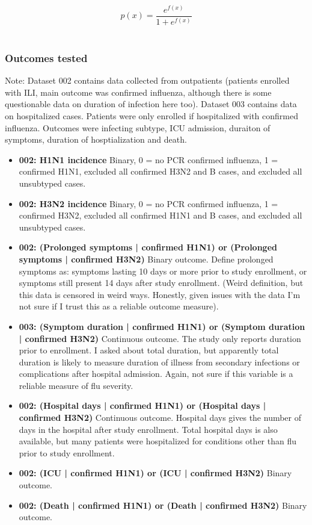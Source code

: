 \documentclass[12pt,twoside]{article}
\begin{document}
\begin{equation}
p(x) = \frac{e^{f(x)}}{1 + e^{f(x)}}
\end{equation}
\\

\subsubsection*{Outcomes tested}

Note: Dataset 002 contains data collected from outpatients (patients enrolled with ILI, main outcome was confirmed influenza, although there is some questionable data on duration of infection here too). Dataset 003 contains data on hospitalized cases. Patients were only enrolled if hospitalized with confirmed influenza. Outcomes were infecting subtype, ICU admission, duraiton of symptoms, duration of hosptialization and death.

\begin{itemize}
\item \textbf{002: H1N1 incidence} Binary, 0 = no PCR confirmed influenza, 1 = confirmed H1N1, excluded all confirmed H3N2 and B cases, and excluded all unsubtyped cases.
\item \textbf{002: H3N2 incidence} Binary, 0 = no PCR confirmed influenza, 1 = confirmed H3N2, excluded all confirmed H1N1 and B cases, and excluded all unsubtyped cases.
\item \textbf{002: (Prolonged symptoms | confirmed H1N1) or (Prolonged symptoms | confirmed H3N2)} Binary outcome. Define prolonged symptoms as: symptoms lasting 10 days or more prior to study enrollment, or symptoms still present 14 days after study enrollment. (Weird definition, but this data is censored in weird ways. Honestly, given issues with the data I'm not sure if I trust this as a reliable outcome measure).
\item \textbf{003: (Symptom duration | confirmed H1N1) or (Symptom duration | confirmed H3N2)} Continuous outcome. The study only reports duration prior to enrollment. I asked about total duration, but apparently total duration is likely to measure duration of illness from secondary infections or complications after hospital admission. Again, not sure if this variable is a reliable measure of flu severity.
\item \textbf{002: (Hospital days | confirmed H1N1) or (Hospital days | confirmed H3N2)} Continuous outcome. Hospital days gives the number of days in the hospital after study enrollment. Total hospital days is also available, but many patients were hospitalized for conditions other than flu prior to study enrollment.
\item \textbf{002: (ICU | confirmed H1N1) or (ICU | confirmed H3N2)} Binary outcome.
\item \textbf{002: (Death | confirmed H1N1) or (Death | confirmed H3N2)} Binary outcome.
\end{itemize}
\end{document}
